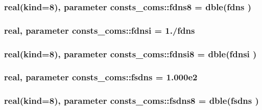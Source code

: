 \subsubsection[{\texorpdfstring{fdns8}{fdns8}}]{\setlength{\rightskip}{0pt plus 5cm}real(kind=8), parameter consts\+\_\+coms\+::fdns8 = dble({\bf fdns} )}\hypertarget{namespaceconsts__coms_ab8ff39ae2abc98414eb2bb5f536fd5a0}{}\label{namespaceconsts__coms_ab8ff39ae2abc98414eb2bb5f536fd5a0}
\subsubsection[{\texorpdfstring{fdnsi}{fdnsi}}]{\setlength{\rightskip}{0pt plus 5cm}real, parameter consts\+\_\+coms\+::fdnsi = 1./{\bf fdns}}\hypertarget{namespaceconsts__coms_ae51d569a4dc215678ec17d04f52645b4}{}\label{namespaceconsts__coms_ae51d569a4dc215678ec17d04f52645b4}
\subsubsection[{\texorpdfstring{fdnsi8}{fdnsi8}}]{\setlength{\rightskip}{0pt plus 5cm}real(kind=8), parameter consts\+\_\+coms\+::fdnsi8 = dble({\bf fdnsi} )}\hypertarget{namespaceconsts__coms_a04cf1d11e9425210216c51d7e79c9ecb}{}\label{namespaceconsts__coms_a04cf1d11e9425210216c51d7e79c9ecb}
\subsubsection[{\texorpdfstring{fsdns}{fsdns}}]{\setlength{\rightskip}{0pt plus 5cm}real, parameter consts\+\_\+coms\+::fsdns = 1.\+000e2}\hypertarget{namespaceconsts__coms_a2fcb787deb1df9a72dae0339dd8143a5}{}\label{namespaceconsts__coms_a2fcb787deb1df9a72dae0339dd8143a5}
\subsubsection[{\texorpdfstring{fsdns8}{fsdns8}}]{\setlength{\rightskip}{0pt plus 5cm}real(kind=8), parameter consts\+\_\+coms\+::fsdns8 = dble({\bf fsdns} )}\hypertarget{namespaceconsts__coms_aa54f1d2828bd67a238029a4f20458937}{}\label{namespaceconsts__coms_aa54f1d2828bd67a238029a4f20458937}
